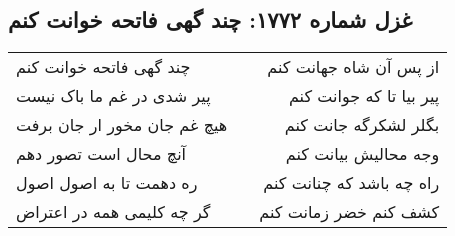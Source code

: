 \begin{center}
\section*{غزل شماره ۱۷۷۲: چند گهی فاتحه خوانت کنم}
\label{sec:1772}
\begin{longtable}{l p{0.5cm} r}
چند گهی فاتحه خوانت کنم
&&
از پس آن شاه جهانت کنم
\\
پیر شدی در غم ما باک نیست
&&
پیر بیا تا که جوانت کنم
\\
هیچ غم جان مخور ار جان برفت
&&
بگلر لشکرگه جانت کنم
\\
آنچ محال است تصور دهم
&&
وجه محالیش بیانت کنم
\\
ره دهمت تا به اصول اصول
&&
راه چه باشد که چنانت کنم
\\
گر چه کلیمی همه در اعتراض
&&
کشف کنم خضر زمانت کنم
\\
\end{longtable}
\end{center}
